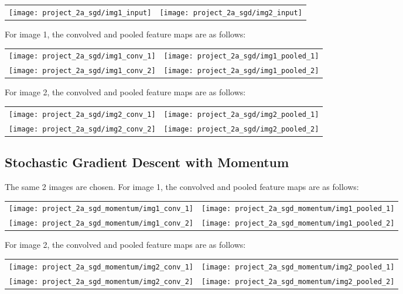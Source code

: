 \begin{longtabu}{X[c]X[c]}
    \texttt{[image: project\_2a\_sgd/img1\_input]} &
    \texttt{[image: project\_2a\_sgd/img2\_input]}
\end{longtabu}

For image 1, the convolved and pooled feature maps are as follows:

\begin{longtabu}{X[c]X[c]}
    \texttt{[image: project\_2a\_sgd/img1\_conv\_1]} &
    \texttt{[image: project\_2a\_sgd/img1\_pooled\_1]} \\
    \texttt{[image: project\_2a\_sgd/img1\_conv\_2]} &
    \texttt{[image: project\_2a\_sgd/img1\_pooled\_2]}
\end{longtabu}

For image 2, the convolved and pooled feature maps are as follows:

\begin{longtabu}{X[c]X[c]}
    \texttt{[image: project\_2a\_sgd/img2\_conv\_1]} &
    \texttt{[image: project\_2a\_sgd/img2\_pooled\_1]} \\
    \texttt{[image: project\_2a\_sgd/img2\_conv\_2]} &
    \texttt{[image: project\_2a\_sgd/img2\_pooled\_2]}
\end{longtabu}

\subsection*{Stochastic Gradient Descent with Momentum}

The same 2 images are chosen.
For image 1, the convolved and pooled feature maps are as follows:

\begin{longtabu}{X[c]X[c]}
    \texttt{[image: project\_2a\_sgd\_momentum/img1\_conv\_1]} &
    \texttt{[image: project\_2a\_sgd\_momentum/img1\_pooled\_1]} \\
    \texttt{[image: project\_2a\_sgd\_momentum/img1\_conv\_2]} &
    \texttt{[image: project\_2a\_sgd\_momentum/img1\_pooled\_2]}
\end{longtabu}

For image 2, the convolved and pooled feature maps are as follows:

\begin{longtabu}{X[c]X[c]}
    \texttt{[image: project\_2a\_sgd\_momentum/img2\_conv\_1]} &
    \texttt{[image: project\_2a\_sgd\_momentum/img2\_pooled\_1]} \\
    \texttt{[image: project\_2a\_sgd\_momentum/img2\_conv\_2]} &
    \texttt{[image: project\_2a\_sgd\_momentum/img2\_pooled\_2]}
\end{longtabu}

